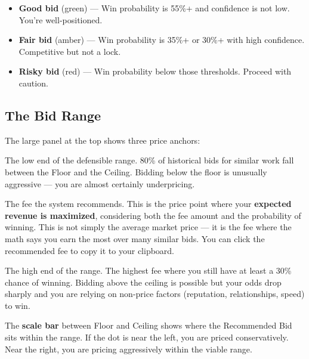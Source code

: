 \documentclass[12pt,a4paper]{article}
\newcommand{\term}[1]{\textbf{#1}}
\begin{document}
\begin{itemize}[leftmargin=2em]
    \item \textcolor{gssgreen}{\textbf{Good bid}} (green) --- Win probability is 55\%+
          and confidence is not low. You're well-positioned.
    \item \textcolor{gssamber}{\textbf{Fair bid}} (amber) --- Win probability is 35\%+
          or 30\%+ with high confidence. Competitive but not a lock.
    \item \textcolor{gssred}{\textbf{Risky bid}} (red) --- Win probability below those
          thresholds. Proceed with caution.
\end{itemize}

\subsection{The Bid Range}

The large panel at the top shows three price anchors:

\begin{description}[leftmargin=1.5em, style=nextline]
    \item[\term{Floor}]
        The low end of the defensible range. 80\% of historical bids for similar work
        fall between the Floor and the Ceiling. Bidding below the floor is unusually
        aggressive --- you are almost certainly underpricing.

    \item[\term{Recommended Bid (or Optimal Bid)}]
        The fee the system recommends. This is the price point where your
        \textbf{expected revenue is maximized}, considering both the fee amount and
        the probability of winning. This is not simply the average market price ---
        it is the fee where the math says you earn the most over many similar bids.
        You can click the recommended fee to copy it to your clipboard.

    \item[\term{Bid Ceiling}]
        The high end of the range. The highest fee where you still have at least a
        30\% chance of winning. Bidding above the ceiling is possible but your odds
        drop sharply and you are relying on non-price factors (reputation,
        relationships, speed) to win.
\end{description}

The \textbf{scale bar} between Floor and Ceiling shows where the Recommended Bid sits
within the range. If the dot is near the left, you are priced conservatively. Near the
right, you are pricing aggressively within the viable range.
\end{document}
